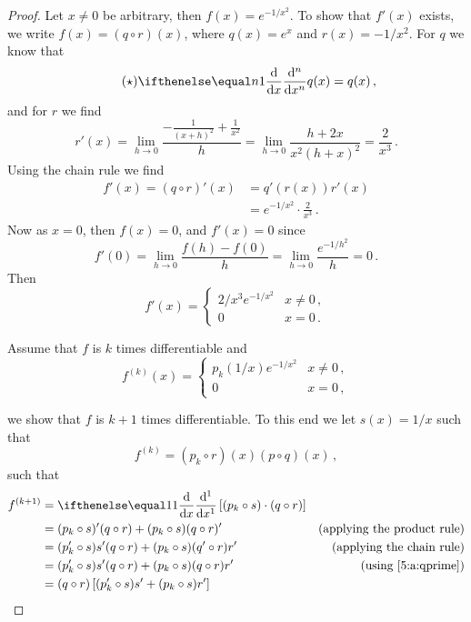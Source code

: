 \documentclass[week=6]{homework}
\begin{document}
\begin{questions}
\begin{parts}
\begin{proof}
	    		Let $x \neq 0$ be arbitrary, then $f(x) = e^{-1/x^2}$. To show that $f'(x)$ exists, we write $f(x) = (q\circ r)(x)$, where $q(x) = e^x$ and $r(x) = -1/x^2$.
	    		For $q$ we know that 
	    		\begin{equation} \label{5:a:qprime} \tag{$\star$}
		    		\diff[x][n]{}q(x) = q(x)\,,
	    		\end{equation}
	    		and for $r$ we find
	    		\[
		    		r'(x) = \lim_{h\to 0} \frac{-\frac{1}{(x+h)^2} + \frac{1}{x^2}}{h} = \lim_{h\to 0} \frac{h+2x}{x^2 (h+x)^2} = \frac{2}{x^3}\,.
	    		\]
	    		Using the chain rule we find
	    		\begin{align*}
	    			f'(x) = (q \circ r)'(x) &= q'(r(x))r'(x) \\
		    			&= e^{-1/x^2}\cdot\frac{2}{x^3}\,.
	    		\end{align*}
	    		Now as $x=0$, then $f(x) = 0$, and $f'(x) = 0$ since
	    		\[
		    		f'(0) = \lim_{h \to 0} \frac{f(h) - f(0)}{h} = \lim_{h \to 0} \frac{e^{-1/h^2}}{h} = 0\,.
	    		\]
	    		Then
	    		\[
		    		f'(x) = \begin{cases} 2/x^3e^{-1/x^2} & x\neq 0\,, \\ 0 & x = 0\,. \end{cases}
	    		\]
	    		
	    		Assume that $f$ is $k$ times differentiable and
	    		\[
		    		f^{(k)}(x) = \begin{cases} p_k(1/x)e^{-1/x^2} & x\neq 0\,, \\ 0 & x = 0\,, \end{cases}
	    		\]
	    		
	    		we show that $f$ is $k+1$ times differentiable. To this end we let $s(x) = 1/x$ such that
	    		\[
		    		f^{(k)} = (p_k \circ r)(x)(p\circ q)(x)\,,
		    	\]
		    	such that
		    	\begin{align*}
		    		f^{(k+1)} &= \diff{} \left[(p_k \circ s)\cdot(q\circ r)\right] \\
		    		&= (p_k \circ s)'(q\circ r) + (p_k \circ s)(q\circ r)' & \mbox{(applying the product rule)} \\
		    		&= (p_k' \circ s)s' (q\circ r) + (p_k \circ s)(q' \circ r)r' & \mbox{(applying the chain rule)} \\
		    		&= (p_k' \circ s)s' (q\circ r) + (p_k \circ s)(q\circ r)r' & \mbox{(using \ref{5:a:qprime})} \\
		    		&= (q\circ r)\left[ (p_k' \circ s)s'  + (p_k \circ s)r' \right]\\
		    	\end{align*}
		    	

\end{proof}
\end{parts}
\end{questions}
\end{document}
